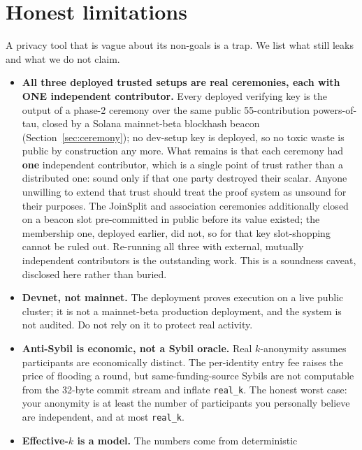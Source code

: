 \documentclass[10pt]{article}
\newcommand{\code}[1]{\texttt{#1}}
\begin{document}
\section{Honest limitations}
\label{sec:limits}

A privacy tool that is vague about its non-goals is a trap. We list what still
leaks and what we do not claim.

\begin{itemize}[leftmargin=1.4em,itemsep=0.15em]
  \item \textbf{All three deployed trusted setups are real ceremonies, each with
        ONE independent contributor.} Every deployed verifying key is the output of
        a phase-2 ceremony over the same public 55-contribution powers-of-tau,
        closed by a Solana mainnet-beta blockhash beacon
        (Section~\ref{sec:ceremony}); no dev-setup key is deployed, so no toxic
        waste is public by construction any more. What remains is that each
        ceremony had \textbf{one} independent contributor, which is a single point
        of trust rather than a distributed one: sound only if that one party
        destroyed their scalar. Anyone unwilling to extend that trust should treat
        the proof system as unsound for their purposes. The JoinSplit and
        association ceremonies additionally closed on a beacon slot pre-committed
        in public before its value existed; the membership one, deployed earlier,
        did not, so for that key slot-shopping cannot be ruled out. Re-running all
        three with external, mutually independent contributors is the outstanding
        work. This is a soundness caveat, disclosed here rather than buried.
  \item \textbf{Devnet, not mainnet.} The deployment proves execution on a live
        public cluster; it is not a mainnet-beta production deployment, and the
        system is not audited. Do not rely on it to protect real activity.
  \item \textbf{Anti-Sybil is economic, not a Sybil oracle.} Real $k$-anonymity
        assumes participants are economically distinct. The per-identity entry fee
        raises the price of flooding a round, but same-funding-source Sybils are
        not computable from the 32-byte commit stream and inflate \code{real\_k}.
        The honest worst case: your anonymity is at least the number of
        participants you personally believe are independent, and at most
        \code{real\_k}.
  \item \textbf{Effective-$k$ is a model.} The numbers come from deterministic

\end{itemize}
\end{document}
